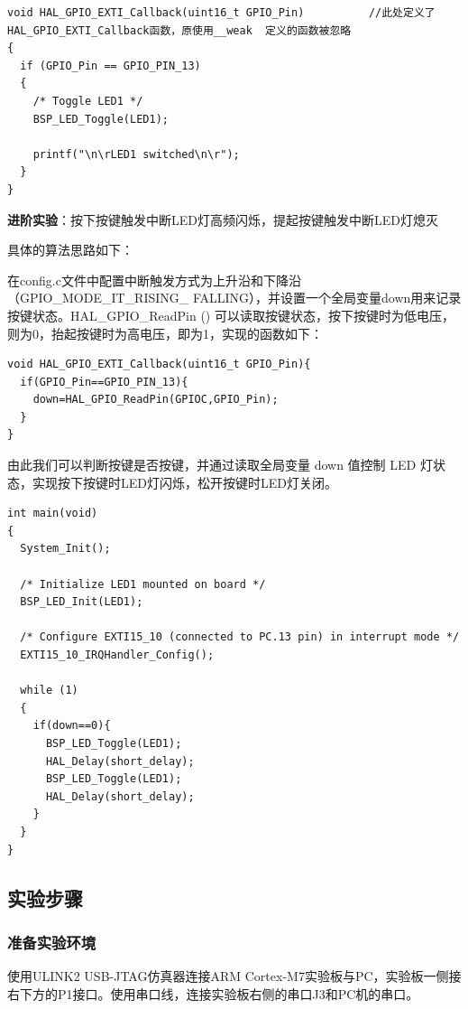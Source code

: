 ﻿\documentclass[UTF8,12pt]{article}
\begin{document}
\begin{lstlisting}[frame=shadowbox]
void HAL_GPIO_EXTI_Callback(uint16_t GPIO_Pin)			//此处定义了HAL_GPIO_EXTI_Callback函数，原使用__weak  定义的函数被忽略
{
  if (GPIO_Pin == GPIO_PIN_13)
  {
    /* Toggle LED1 */
    BSP_LED_Toggle(LED1);
    
    printf("\n\rLED1 switched\n\r");
  }
}
\end{lstlisting}

\noindent
\textbf{进阶实验}：按下按键触发中断LED灯高频闪烁，提起按键触发中断LED灯熄灭

具体的算法思路如下：

在config.c文件中配置中断触发方式为上升沿和下降沿（GPIO\_MODE\_IT\_RISING\_
FALLING），并设置一个全局变量down用来记录按键状态。HAL\_GPIO\_ReadPin () 可以读取按键状态，按下按键时为低电压，则为0，抬起按键时为高电压，即为1，实现的函数如下：

\begin{lstlisting}[frame=shadowbox]
void HAL_GPIO_EXTI_Callback(uint16_t GPIO_Pin){
  if(GPIO_Pin==GPIO_PIN_13){
    down=HAL_GPIO_ReadPin(GPIOC,GPIO_Pin);
  }
}
\end{lstlisting}
由此我们可以判断按键是否按键，并通过读取全局变量 down 值控制 LED 灯状态，实现按下按键时LED灯闪烁，松开按键时LED灯关闭。  

\begin{lstlisting}[frame=shadowbox]
int main(void)
{
  System_Init();
  
  /* Initialize LED1 mounted on board */
  BSP_LED_Init(LED1);
  
  /* Configure EXTI15_10 (connected to PC.13 pin) in interrupt mode */
  EXTI15_10_IRQHandler_Config();
  
  while (1)
  {
    if(down==0){
      BSP_LED_Toggle(LED1);
      HAL_Delay(short_delay);
      BSP_LED_Toggle(LED1);
      HAL_Delay(short_delay);
    }
  }
}
\end{lstlisting}

\subsection{实验步骤}

\subsubsection{准备实验环境}
使用ULINK2 USB-JTAG仿真器连接ARM Cortex-M7实验板与PC，实验板一侧接右下方的P1接口。使用串口线，连接实验板右侧的串口J3和PC机的串口。
\end{document}
